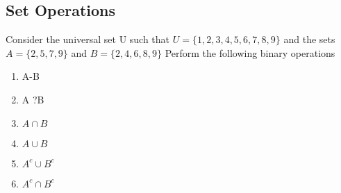\documentclass[12pt]{article}
\begin{document}
\subsection{Set Operations}
Consider the universal set U such that $U=\{1,2,3,4,5,6,7,8,9\}$  and the sets $A=\{2,5,7,9\}$  and  $B=\{2,4,6,8,9\}$
Perform the following binary operations
\begin{enumerate}
\item A-B
\item  A ?B
\item  $A \cap B$
\item $A\cup B$
\item $A^{c} \cup B^{c}$
\item $A^{c}\cap B^{c}$
\end{enumerate}
\end{document}
